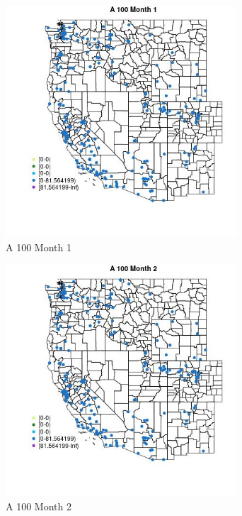 \begin{figure} 
\centering  
\includegraphics[width=0.77\textwidth]{Code_Outputs/Report_ML_input_PM25_Step4_part_e_de_duplicated_aveswNAs_MapObsMo1A_100.jpg} 
\caption{\label{fig:Report_ML_input_PM25_Step4_part_e_de_duplicated_aveswNAsMapObsMo1A_100}A 100 Month 1} 
\end{figure} 
 

\begin{figure} 
\centering  
\includegraphics[width=0.77\textwidth]{Code_Outputs/Report_ML_input_PM25_Step4_part_e_de_duplicated_aveswNAs_MapObsMo2A_100.jpg} 
\caption{\label{fig:Report_ML_input_PM25_Step4_part_e_de_duplicated_aveswNAsMapObsMo2A_100}A 100 Month 2} 
\end{figure} 
 


